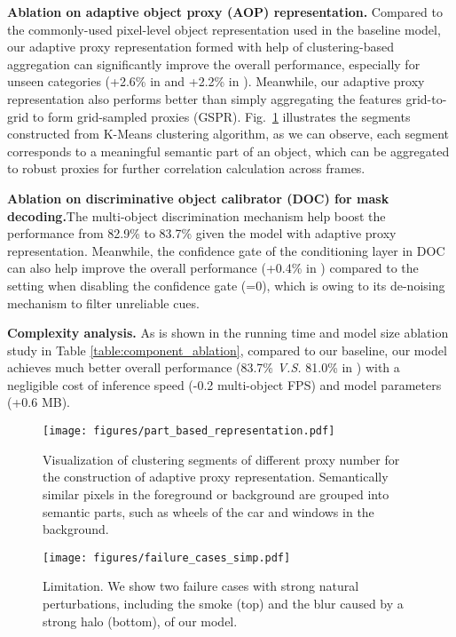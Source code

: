 \documentclass[sigconf]{acmart}
\begin{document}
\noindent\textbf{Ablation on adaptive object proxy (AOP) representation.}
Compared to the commonly-used pixel-level object representation used in the baseline model, our adaptive proxy representation formed with help of clustering-based aggregation can significantly improve the overall performance, especially for unseen categories (+2.6\% in  and +2.2\% in ). Meanwhile, our adaptive proxy representation also performs better than simply aggregating the features grid-to-grid to form grid-sampled proxies (GSPR). Fig.~\ref{fig:clustering_examples} illustrates the segments constructed from K-Means clustering algorithm, as we can observe, each segment corresponds to a meaningful semantic part of an object, which can be aggregated to robust proxies for further correlation calculation across frames.

\noindent\textbf{Ablation on discriminative object calibrator (DOC) for mask decoding.}The multi-object discrimination mechanism help boost the performance from 82.9\% to 83.7\% given the model with adaptive proxy representation. Meanwhile, the confidence gate of the conditioning layer in DOC can also help improve the overall performance (+0.4\% in ) compared to the setting when disabling the confidence gate (=0), which is owing to its de-noising mechanism to filter unreliable cues.

\noindent\textbf{Complexity analysis.} As is shown in the running time and model size ablation study in Table \ref{table:component_ablation}, compared to our baseline, our model achieves much better overall performance (83.7\% \textit{V.S.} 81.0\% in ) with a negligible cost of inference speed (-0.2 multi-object FPS) and model parameters (+0.6 MB).

\begin{figure}[t]
	\centering
	\texttt{[image: figures/part\_based\_representation.pdf]}
\caption{Visualization of clustering segments of different proxy number  for the construction of adaptive proxy representation. Semantically similar pixels in the foreground or background are grouped into semantic parts, such as wheels of the car and windows in the background.}
	\label{fig:clustering_examples}
\end{figure} \begin{figure}[t!]
	\centering
	\texttt{[image: figures/failure\_cases\_simp.pdf]}
\caption{Limitation. We show two failure cases with strong natural perturbations, including the smoke (top) and the blur caused by a strong halo (bottom), of our model.}
	\label{fig:failure_case}
\end{figure} 
\end{document}
